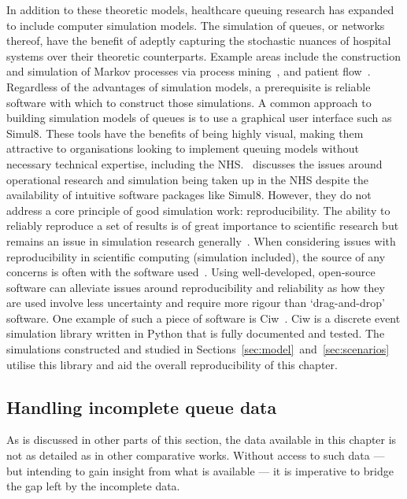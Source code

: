 In addition to these theoretic models, healthcare queuing research has expanded
to include computer simulation models. The simulation of queues, or networks
thereof, have the benefit of adeptly capturing the stochastic nuances of
hospital systems over their theoretic counterparts. Example areas include the
construction and simulation of Markov processes via process
mining~\cite{Arnolds2018,Rebuge2012}, and patient flow~\cite{Bhattacharjee2014}.
Regardless of the advantages of simulation models, a prerequisite is reliable
software with which to construct those simulations. A common approach to
building simulation models of queues is to use a graphical user interface such
as Simul8. These tools have the benefits of being highly visual, making them
attractive to organisations looking to implement queuing models without
necessary technical expertise, including the NHS.~\cite{Brailsford2013}
discusses the issues around operational research and simulation being taken up
in the NHS despite the availability of intuitive software packages like Simul8.
However, they do not address a core principle of good simulation work:
reproducibility. The ability to reliably reproduce a set of results is of great
importance to scientific research but remains an issue in simulation research
generally~\cite{Fitzpatrick2019}. When considering issues with reproducibility
in scientific computing (simulation included), the source of any concerns is
often with the software used~\cite{Ivie2018}. Using well-developed, open-source
software can alleviate issues around reproducibility and reliability as how they
are used involve less uncertainty and require more rigour than ‘drag-and-drop’
software. One example of such a piece of software is Ciw~\cite{Palmer2019}. Ciw
is a discrete event simulation library written in Python that is fully
documented and tested. The simulations constructed and studied in
Sections~\ref{sec:model}~and~\ref{sec:scenarios} utilise this library and aid
the overall reproducibility of this chapter.

\subsection{Handling incomplete queue data}

As is discussed in other parts of this section, the data available in this chapter
is not as detailed as in other comparative works. Without access to such data
--- but intending to gain insight from what is available --- it is
imperative to bridge the gap left by the incomplete data.

